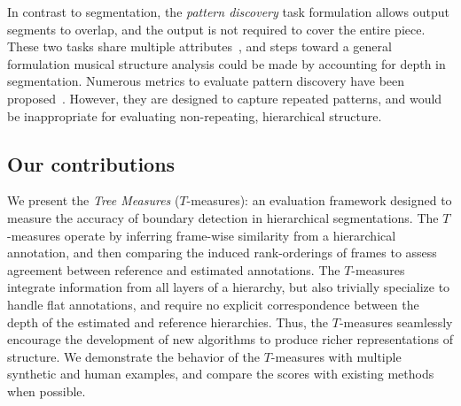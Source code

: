 \documentclass{article}
\begin{document}
In contrast to segmentation, the \emph{pattern discovery} task formulation allows output segments to overlap, 
and the output is not required to cover the entire piece.
These two tasks share multiple attributes~\cite{Nieto2014_Motives}, and steps toward a 
general formulation musical structure analysis could be made by accounting for depth in segmentation.
Numerous metrics to evaluate pattern discovery have been proposed~\cite{Collins2013}.
However, they are designed to capture repeated patterns, and would be inappropriate for 
evaluating non-repeating, hierarchical structure.


\subsection{Our contributions}
We present the \emph{Tree Measures} ($T$-measures): an evaluation framework designed
to measure the accuracy of boundary detection in hierarchical segmentations.
The $T$-measures operate by inferring frame-wise similarity from a hierarchical annotation, and then comparing 
the induced rank-orderings of frames to assess agreement between reference and estimated annotations.
The $T$-measures integrate information from all layers of a hierarchy, but also trivially
specialize to handle flat annotations, and require no explicit correspondence between the
depth of the estimated and reference hierarchies.
Thus, the $T$-measures seamlessly encourage the development of new algorithms to produce richer representations of structure.
We demonstrate the behavior of the $T$-measures with multiple synthetic and human examples, and compare the scores with existing methods when possible.

\end{document}
